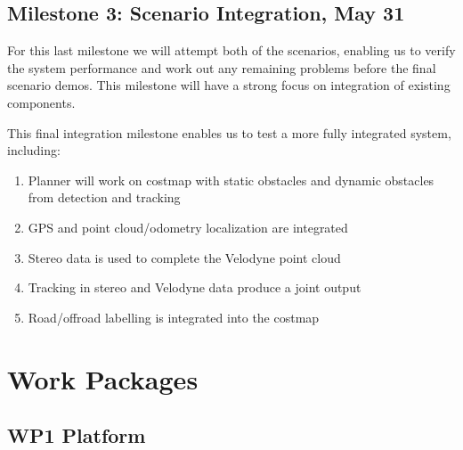 \documentclass[11pt,a4paper]{article}
\begin{document}
\subsection{Milestone 3: Scenario Integration, May 31}
\label{milestone3}

For this last milestone we will attempt both of the scenarios, enabling
us to verify the system performance and work out any remaining problems
before the final scenario demos. This milestone will have a strong
focus on integration of existing components.

This final integration milestone enables us to test a more fully integrated system, including:
\begin{enumerate}
\item Planner will work on costmap with static obstacles and dynamic obstacles from detection and tracking
\item GPS and point cloud/odometry localization are integrated
\item Stereo data is used to complete the Velodyne point cloud
\item Tracking in stereo and Velodyne data produce a joint output
\item Road/offroad labelling is integrated into the costmap
\end{enumerate}

\section{Work Packages}

\subsection{WP1 Platform} %
\end{document}
